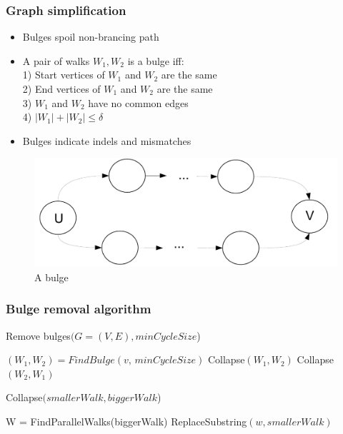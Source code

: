 \documentclass[svgnames,14pt]{beamer}
\begin{document}
\begin{frame}
\frametitle{Graph simplification}
\begin{itemize}
\item Bulges spoil non-brancing path
\item A pair of walks \(W_{1}, W_{2}\) is a bulge iff: \\
1) Start vertices of  \(W_{1} \) and  \(W_{2}\) are the same \\
2) End vertices of  \(W_{1} \) and  \(W_{2}\) are the same \\
3) \(W_{1} \) and  \(W_{2}\) have no common edges \\
4) \(|W_{1}| +|W_{2}| \leq \delta \)
\item Bulges indicate indels and mismatches 
\end{itemize}
\begin{changemargin}{-1.cm}{-1.cm}
\begin{figure}
\centering
\includegraphics[scale = 0.40]{Figure2.pdf}
\small \caption{A bulge}
\end{figure}
\end{changemargin}
\end{frame}

\begin{frame}
\frametitle{Bulge removal algorithm}
\begin{algorithm}[H]               
\small
\caption*{Remove bulges\((G = (V, E),  minCycleSize \))} 
\begin{algorithmic}[1]     							
		\State \( (W_{1}, W_{2}) = FindBulge(v, \,minCycleSize) \)
			\State Collapse\( (W_{1}, W_{2}) \)
		\Else
			\State Collapse\( (W_{2}, W_{1}) \)
		\EndIf
	\EndWhile
\EndFor
\end{algorithmic}
\end{algorithm}

\begin{algorithm}[H]     
\small
\caption*{Collapse\((smallerWalk, biggerWalk\))} 
\begin{algorithmic}[1]     							
\State W = FindParallelWalks(biggerWalk)
	\State ReplaceSubstring\( (w, smallerWalk) \)
\EndFor
\end{algorithmic}
\end{algorithm}
\end{frame}
\end{document}
